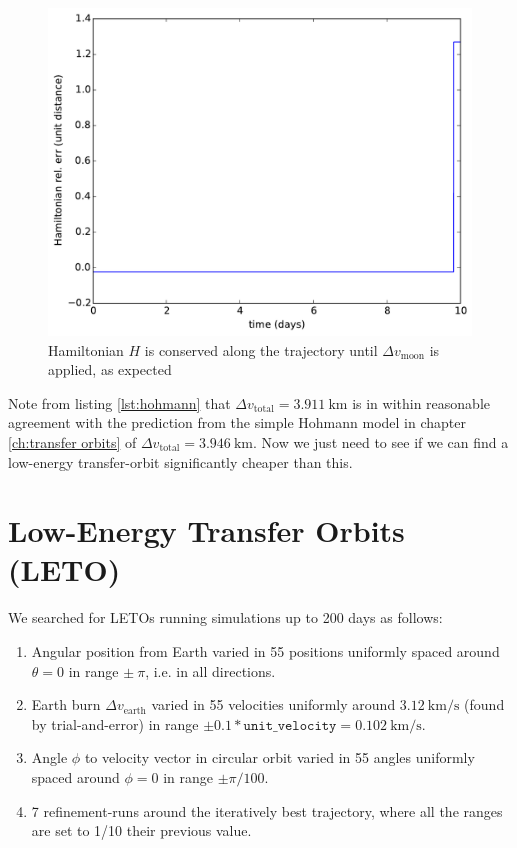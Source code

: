 \begin{figure}[ht!]
\centering
\includegraphics[scale=0.35]{fig/hohmann/H_Hohmann.pdf}
\caption{Hamiltonian $H$ is conserved along the trajectory until $\Delta v_{\text{moon}}$ is applied, as expected}
\label{fig:hohmann-H}
\end{figure}
Note from listing \ref{lst:hohmann} that $\Delta v_{\text{total}} = \SI{3.911}{\km}$ is in within reasonable agreement with the prediction from the simple Hohmann model in chapter \ref{ch:transfer orbits} of $\Delta v_{\text{total}} = \SI{3.946}{\km}$. Now we just need to see if we can find a low-energy transfer-orbit significantly cheaper than this.


\section{Low-Energy Transfer Orbits (LETO)}
We searched for LETOs running simulations up to 200 days as follows:
\begin{enumerate}
    \item Angular position from Earth varied in 55 positions uniformly spaced around $\theta=0$ in range $\pm\ \pi$, i.e. in all directions.
    \item Earth burn $\Delta v_{\text{earth}}$ varied in 55 velocities uniformly around $\SI{3.12}{\km\per\s}$ (found by trial-and-error) in range $\pm 0.1*\texttt{unit\_velocity} = \SI{0.102}{\km\per\s}.$
    \item Angle $\phi$ to velocity vector in circular orbit varied in 55 angles uniformly spaced around $\phi=0$ in range $\pm \pi/100.$
    \item 7 refinement-runs around the iteratively best trajectory, where all the ranges are set to 1/10 their previous value.
\end{enumerate}


